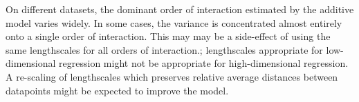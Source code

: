 On different datasets, the dominant order of interaction estimated by the additive model varies widely.
In some cases, the variance is concentrated almost entirely onto a single order of interaction.
This may may be a side-effect of using the same lengthscales for all orders of interaction.; lengthscales appropriate for low-dimensional regression might not be appropriate for high-dimensional regression.
A re-scaling of lengthscales which preserves relative average distances between datapoints might be expected to improve the model.
%
%







